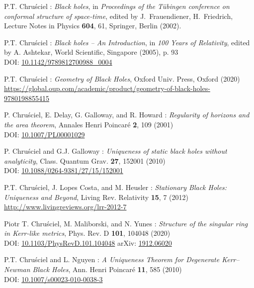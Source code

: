 \begin{thebibliography}{123}
P.T. Chru\'sciel : {\em Black holes},
in {\em Proceedings of the T\"ubingen conference on conformal structure of
space-time}, edited by J.~Frauendiener, H.~Friedrich,
Lecture Notes in Physics {\bf 604}, 61,
Springer, Berlin (2002).

P.T. Chru\'sciel : {\em Black holes -- An Introduction},
in {\em 100 Years of Relativity}, edited by A. Ashtekar,
World Scientific, Singapore (2005), p. 93\\
DOI: \href{https://doi.org/10.1142/9789812700988_0004}{10.1142/9789812700988\_0004}

P.T. Chru\'sciel : {\em Geometry of Black Holes},
Oxford Univ. Press, Oxford (2020)\\
{\footnotesize \url{https://global.oup.com/academic/product/geometry-of-black-holes-9780198855415}}

P. Chru\'sciel, E. Delay, G. Galloway, and R. Howard :
{\em Regularity of horizons and the area theorem},
Annales Henri Poincar\'e {\bf 2}, 109 (2001)\\
DOI: \href{https://doi.org/10.1007/PL00001029}{10.1007/PL00001029}

P. Chru\'sciel and G.J. Galloway :
{\em Uniqueness of static black holes without analyticity},
Class. Quantum Grav. {\bf 27}, 152001 (2010)\\
DOI: \href{https://doi.org/10.1088/0264-9381/27/15/152001}{10.1088/0264-9381/27/15/152001}

P.T. Chru\'sciel, J. Lopes Costa, and M. Heusler :
{\em Stationary Black Holes: Uniqueness and Beyond},
Living Rev. Relativity {\bf 15}, 7 (2012) \\
\url{http://www.livingreviews.org/lrr-2012-7}

Piotr T. Chru\'sciel, M. Maliborski, and N. Yunes :
{\em Structure of the singular ring in Kerr-like metrics},
Phys. Rev. D {\bf 101}, 104048 (2020)\\
DOI: \href{https://doi.org/10.1103/PhysRevD.101.104048}{10.1103/PhysRevD.101.104048}\hfill
arXiv: \href{https://arxiv.org/abs/1912.06020}{1912.06020}

P.T. Chru\'sciel and L. Nguyen :
{\em A Uniqueness Theorem for Degenerate Kerr–Newman Black Holes},
Ann. Henri Poincar\'e {\bf 11}, 585 (2010)\\
DOI: \href{https://doi.org/10.1007/s00023-010-0038-3}{10.1007/s00023-010-0038-3}


\end{thebibliography}
